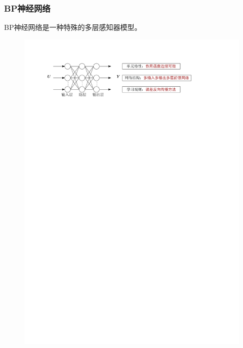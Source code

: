 \subsubsection{BP神经网络}
BP神经网络是一种特殊的多层感知器模型。
\begin{figure}[htbp]
    \centering
    \includegraphics{image/BP神经网络的三要素.pdf}
\end{figure}
